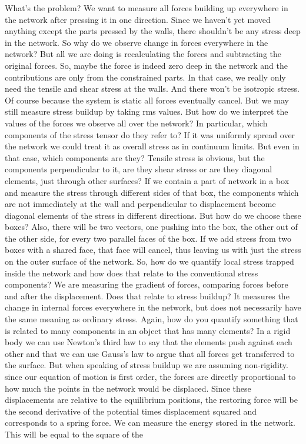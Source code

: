 \documentclass[nofootinbib,preprint,floatfix,endfloats]{revtex4} %
\begin{document}
{{What's the problem? We want to measure all forces building up everywhere in the network after pressing it in one direction. Since we haven't yet moved anything except the parts pressed by the walls, there shouldn't be any stress deep in the network. So why do we observe change in forces everywhere in the network? But all we are doing is recalculating the forces and subtracting the original forces. So, maybe the force is indeed zero deep in the network and the contributions are only from the constrained parts. In that case, we really only need the tensile and shear stress at the walls. And there won't be isotropic stress. Of course because the system is static all forces eventually cancel. But we may still measure stress buildup by taking rms values. But how do we interpret the values of the forces we observe all over the network? In particular, which components of the stress tensor do they refer to? If it was uniformly spread over the network we could treat it as overall stress as in continuum limits. But even in that case, which components are they? Tensile stress is obvious, but the components perpendicular to it, are they shear stress or are they diagonal elements, just through other surfaces? If we contain a part of network in a box and measure the stress through different sides of that box, the components which are not immediately at the wall and perpendicular to displacement become diagonal elements of the stress in different directions. But how do we choose these boxes? Also, there will be two vectors, one pushing into the box, the other out of the other side, for every two parallel faces of the box. If we add stress from two boxes with a shared face, that face will cancel, thus leaving us with just the stress on the outer surface of the network. So, how do we quantify local stress trapped inside the network and how does that relate to the conventional stress components? We are measuring the gradient of forces, comparing forces before and after the displacement. Does that relate to stress buildup? It measures the change in internal forces everywhere in the network, but does not necessarily have the same meaning as ordinary stress. Again, how do you quantify something that is related to many components in an object that has many elements? In a rigid body we can use Newton's third law to say that the elements push against each other and that we can use Gauss's law to argue that all forces get transferred to the surface. But when speaking of stress buildup we are assuming non-rigidity.
since our equation of motion is first order, the forces are directly proportional to how much the points in the network would be displaced. Since these displacements are relative to the equilibrium positions, the restoring force will be the second derivative of the potential times displacement squared and corresponds to a spring force.  
We can measure the energy stored in the network. This will be equal to the square of the  
}

}
\end{document}
